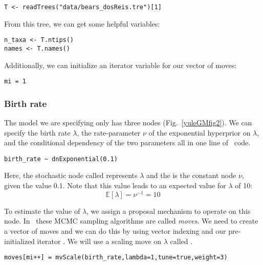 {\tt \begin{snugshade*}
\begin{lstlisting}
T <- readTrees("data/bears_dosReis.tre")[1]
\end{lstlisting}
\end{snugshade*}}

From this tree, we can get some helpful variables:
{\tt \begin{snugshade*}
\begin{lstlisting}
n_taxa <- T.ntips()
names <- T.names()
\end{lstlisting}
\end{snugshade*}}

Additionally, we can initialize an iterator variable for our vector of moves:
{\tt \begin{snugshade*}
\begin{lstlisting}
mi = 1 
\end{lstlisting}
\end{snugshade*}}

\subsubsection{Birth rate}

The model we are specifying only has three nodes (Fig.~\ref{yuleGMfig2}). 
We can specify the birth rate $\lambda$, the rate-parameter $\nu$ of the exponential hyperprior on $\lambda$, and the conditional dependency of the two parameters all in one line of \Rev~code.
{\tt \begin{snugshade*}
\begin{lstlisting}
birth_rate ~ dnExponential(0.1) 
\end{lstlisting}
\end{snugshade*}}
Here, the stochastic node called  represents $\lambda$ and the  is the constant node $\nu$, given the value 0.1. 
Note that this value leads to an expected value for $\lambda$ of 10:
$$\mathbb{E}[\lambda]=\nu^{-1} = 10$$

To estimate the value of $\lambda$, we assign a proposal mechanism to operate on this node. 
In \RevBayes~these MCMC sampling algorithms are called \textit{moves}. 
We need to create a vector of moves and we can do this by using vector indexing and our pre-initialized iterator .
We will use a scaling move on $\lambda$ called .
{\tt \begin{snugshade*}
\begin{lstlisting}
moves[mi++] = mvScale(birth_rate,lambda=1,tune=true,weight=3)
\end{lstlisting}
\end{snugshade*}}


